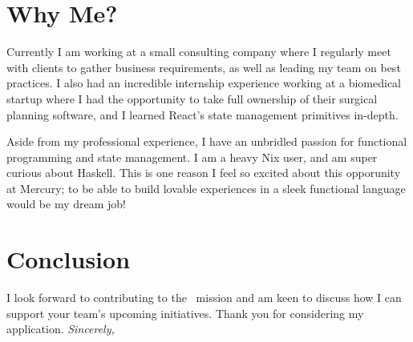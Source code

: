 \section{Why Me?}
	Currently I am working at a small consulting company where I regularly meet with clients to gather business requirements, as well as leading my team on best practices. I also had an incredible internship experience working at a biomedical startup where I had the opportunity to take full ownership of their surgical planning software, and I learned React's state management primitives in-depth.

	Aside from my professional experience, I have an unbridled passion for functional programming and state management. I am a heavy Nix user, and am super curious about Haskell. This is one reason I feel so excited about this opporunity at Mercury; to be able to build lovable experiences in a sleek functional language would be my dream job!

\section{Conclusion}
I look forward to contributing to the \companyName~mission and am keen to discuss how I can support your team's upcoming initiatives. Thank you for considering my application.
\newline
\newline
\large{
	\textit{Sincerely,}\\
	\userFullName
}

